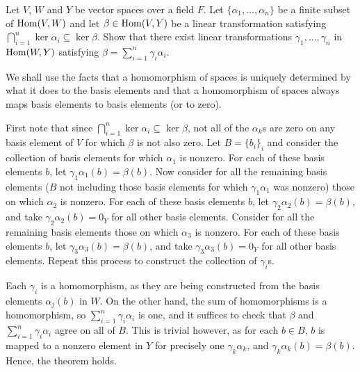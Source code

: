 \begin{problem}[Golan 306]
Let $V$, $W$ and $Y$ be vector spaces over a field $F$.  Let 
$\{\alpha_1, \dots, \alpha_n\}$ be a finite subset of $\operatorname{Hom}(V, W)$
and let $\beta \in \operatorname{Hom}(V,Y)$ be a linear transformation satisfying
$\bigcap_{i=1}^n \ker{\alpha_i} \subseteq \ker{\beta}$.  Show that there exist
linear transformations $\gamma_1, \dots, \gamma_n$ in $\operatorname{Hom}(W,Y)$ satisfying
$\beta = \sum_{i=1}^n \gamma_i \alpha_i$.
\end{problem}
\smallskip
\begin{solution}
We shall use the facts that a homomorphism of spaces is uniquely determined by what it does to the basis elements and that a homomorphism of spaces always maps basis elements to basis elements (or to zero).  

First note that since $\bigcap_{i=1}^n \ker{\alpha_i} \subseteq \ker{\beta}$, not all of the $\alpha_k$s are zero on any basis element of $V$ for which $\beta$ is not also zero.  Let $B = \{b_i\}_i$ and consider the collection of basis elements for which $\alpha_1$ is nonzero.  For each of these basis elements $b$, let $\gamma_1\alpha_1(b) = \beta(b)$. Now consider for all the remaining basis elements ($B$ not including those basis elements for which $\gamma_1\alpha_1$ was nonzero) those on which $\alpha_2$ is nonzero.  For each of these basis elements $b$, let $\gamma_2\alpha_2(b) = \beta(b)$, and take $\gamma_2\alpha_2(b) = 0_Y$ for all other basis elements.  Consider for all the remaining basis elements those on which $\alpha_3$ is nonzero.  For each of these basis elements $b$, let $\gamma_3\alpha_3(b) = \beta(b)$, and take $\gamma_3\alpha_3(b) = 0_Y$ for all other basis elements.  Repeat this process to construct the collection of $\gamma_i$s.  

Each $\gamma_i$ is a homomorphism, as they are being constructed from the basis elements $\alpha_j(b)$ in $W$.  On the other hand, the sum of homomorphisms is a homomorphism, so $\sum_{i=1}^n \gamma_i \alpha_i$ is one, and it suffices to check that $\beta$ and $\sum_{i=1}^n \gamma_i \alpha_i$ agree on all of $B$.  This is trivial however, as for each $b\in B$, $b$ is mapped to a nonzero element in $Y$ for precisely one $\gamma_k\alpha_k$, and $\gamma_k\alpha_k(b) = \beta(b)$.  Hence, the theorem holds.
\end{solution}


\probskip


